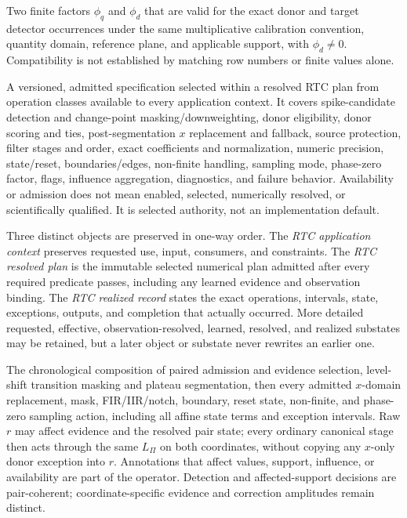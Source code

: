 \begin{description}[style=nextline,leftmargin=1em,labelindent=0pt,
  labelwidth=0pt,labelsep=0pt]
\item[SCI-RTC-DEF-005 -- Compatible \texttt{flxscale} pair.]
Two finite factors $\phi_q$ and $\phi_d$ that are valid for the exact donor
and target detector occurrences under the same multiplicative calibration
convention, quantity domain, reference plane, and applicable support, with
$\phi_d\neq0$.  Compatibility is not established by matching row numbers or
finite values alone.

\item[SCI-RTC-DEF-006 -- Selected conditioning policy.]
A versioned, admitted specification selected within a resolved RTC plan from
operation classes available to every application context.  It covers
spike-candidate detection and
change-point masking/downweighting, donor eligibility, donor scoring and ties,
post-segmentation $x$ replacement and fallback, source protection,
filter stages and order, exact coefficients and normalization, numeric
precision, state/reset, boundaries/edges, non-finite handling, sampling mode,
phase-zero factor, flags, influence aggregation, diagnostics, and failure
behavior.  Availability or admission does not mean enabled, selected,
numerically resolved, or scientifically qualified.  It is selected authority,
not an implementation default.

\item[SCI-RTC-DEF-007 -- One-way context--plan--record lifecycle.]
Three distinct objects are preserved in one-way order.  The
\emph{RTC application context} preserves requested use, input, consumers, and
constraints.  The \emph{RTC resolved plan} is the immutable selected numerical
plan admitted after every required predicate passes, including any learned
evidence and observation binding.  The \emph{RTC realized record} states the
exact operations, intervals, state, exceptions, outputs, and completion that
actually occurred.  More detailed requested, effective, observation-resolved,
learned, resolved, and realized substates may be retained, but a later object
or substate never rewrites an earlier one.

\item[SCI-RTC-DEF-008 -- Realized conditioning operator.]
The chronological composition of paired admission and evidence selection,
level-shift transition masking and plateau segmentation, then every admitted
$x$-domain replacement, mask, FIR/IIR/notch, boundary, reset state,
non-finite, and phase-zero sampling action, including all affine state terms
and exception intervals.  Raw $r$ may affect evidence and the resolved pair
state; every ordinary canonical stage then acts through the same $L_\Pi$ on
both coordinates, without copying any $x$-only donor exception into $r$.
Annotations that affect values, support, influence, or availability are part
of the operator.  Detection and affected-support decisions are pair-coherent;
coordinate-specific evidence and correction amplitudes remain distinct.


\end{description}
